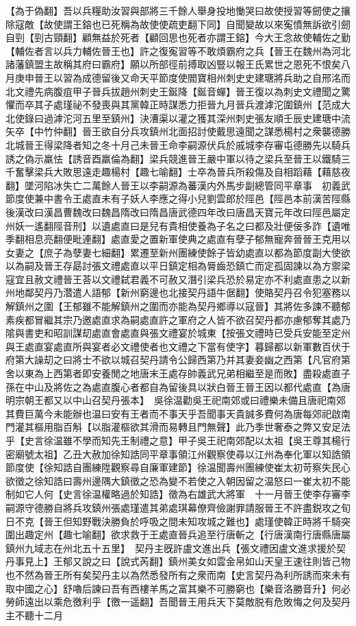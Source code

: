 【為于偽翻】吾以兵糧助汝習與部將三千餘人舉身投地慟哭曰故使授習等劒使之攘除寇敵【故使謂王鎔也已死稱為故使使疏吏翻下同】自聞變故以來寃憤無訴欲引劒自剄【剄古頸翻】顧無益於死者【顧回思也死者亦謂王鎔】今大王念故使輔佐之勤【輔佐者言以兵力輔佐晉王也】許之復寃習等不敢煩霸府之兵【晉王在魏州為河北諸藩鎮盟主故稱其府曰霸府】願以所部徑前搏取凶豎以報王氏累世之恩死不恨矣八月庚申晉王以習為成德留後又命天平節度使閻寶相州刺史史建瑭將兵助之自邢洺而北文禮先病腹疽甲子晉兵拔趙州刺史王鋋降【鋋音蟬】晉王復以為刺史文禮聞之驚懼而卒其子處瑾祕不發喪與其黨韓正時謀悉力拒晉九月晉兵渡滹沱圍鎮州【范成大北使錄曰過滹沱河五里至鎮州】決漕渠以灌之獲其深州刺史張友順壬辰史建瑭中流矢卒【中竹仲翻】晉王欲自分兵攻鎮州北面招討使戴思遠聞之謀悉楊村之衆襲德勝北城晉王得梁降者知之冬十月己未晉王命李嗣源伏兵於戚城李存審屯德勝先以騎兵誘之偽示羸怯【誘音酉羸倫為翻】梁兵競進晉王嚴中軍以待之梁兵至晉王以鐵騎三千奮擊梁兵大敗思遠走趣楊村【趣七喻翻】士卒為晉兵所殺傷及自相蹈藉【藉慈夜翻】墜河陷冰失亡二萬餘人晉王以李嗣源為蕃漢内外馬步副總管同平章事　初義武節度使兼中書令王處直未有子妖人李應之得小兒劉雲郎於陘邑【陘邑本前漢苦陘縣後漢改曰漢昌曹魏改曰魏昌隋改曰隋昌唐武德四年改曰唐昌天寶元年改曰陘邑屬定州妖一遙翻陘音刑】以遺處直曰是兒有貴相使養為子名之曰都及壯便佞多詐【遺唯季翻相息亮翻便毗連翻】處直愛之置新軍使典之處直有孽子郁無寵奔晉晉王克用以女妻之【庶子為孽妻七細翻】累遷至新州團練使餘子皆幼處直以都為節度副大使欲以為嗣及晉王存勗討張文禮處直以平日鎮定相為脣齒恐鎮亡而定孤固諫以為方禦梁寇宜且赦文禮晉王荅以文禮弑君義不可赦又潛引梁兵恐於易定亦不利處直患之以新州地鄰契丹乃濳遣人語郁【新州窮邊也北接契丹語牛倨翻】使賂契丹召令犯塞務以解鎮州之圍【王郁雖不能解鎮州之圍而亦能為契丹鄉導以寇晉】其將佐多諫不聽郁素疾都冒繼其宗乃邀處直求為嗣處直許之軍府之人皆不欲召契丹都亦慮郁奪其處乃隂與書吏和昭訓謀刧處直會處直與張文禮宴於城東【按張文禮時已受兵安能至定州與王處直宴處直所與宴者必文禮使者也文禮之下當有使字】暮歸都以新軍數百伏于府第大譟刧之曰將士不欲以城召契丹請令公歸西第乃并其妻妾幽之西第【凡官府第舍以東為上西第者即安養閒之地唐末王處存帥義武兄弟相繼至是而敗】盡殺處直子孫在中山及將佐之為處直腹心者都自為留後具以狀白晉王晉王因以都代處直【為唐明宗朝王都又以中山召契丹張本】　吳徐温勸吳王祀南郊或曰禮樂未備且唐祀南郊其費巨萬今未能辦也温曰安有王者而不事天乎吾聞事天貴誠多費何為唐每郊祀啟南門灌其樞用脂百斛【以脂灌樞欲其滑而易轉且門無聲】此乃季世奢泰之弊又安足法乎【史言徐温雖不學而知先王制禮之意】甲子吳王祀南郊配以太祖【吳王尊其楊行密廟號太祖】乙丑大赦加徐知誥同平章事領江州觀察使尋以江州為奉化軍以知誥領節度使【徐知誥自團練陞觀察尋自廉軍建節】徐温聞壽州團練使崔太初苛察失民心欲徵之徐知誥曰壽州邊隅大鎮徵之恐為變不若使之入朝因留之温怒曰一崔太初不能制如它人何【史言徐温權略過於知誥】徵為右雄武大將軍　十一月晉王使李存審李嗣源守德勝自將兵攻鎮州張處瑾遣其弟處琪幕僚齊儉謝罪請服晉王不許盡鋭攻之旬日不克【晉王但知野戰決勝負於呼吸之間未知攻城之難也】處瑾使韓正時將千騎突圍出趣定州【趣七喻翻】欲求救于王處直晉兵追至行唐斬之【行唐漢南行唐縣唐屬鎮州九域志在州北五十五里】　契丹主旣許盧文進出兵【張文禮因盧文進求援於契丹事見上】王郁又說之曰【說式芮翻】鎮州美女如雲金帛如山天皇王速往則皆己物也不然為晉王所有矣契丹主以為然悉發所有之衆而南【史言契丹為利所誘而來未有取中國之心】舒嚕后諫曰吾有西樓羊馬之富其樂不可勝窮也【樂音洛勝音升】何必勞師遠出以乘危徼利乎【徼一遥翻】吾聞晉王用兵天下莫敵脱有危敗悔之何及契丹主不聽十二月